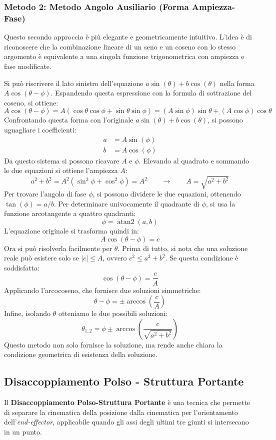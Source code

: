 \documentclass[11pt, a4paper]{report}
\begin{document}
\newpage
\subsubsection*{Metodo 2: Metodo Angolo Ausiliario (Forma Ampiezza-Fase)}

Questo secondo approccio è più elegante e geometricamente intuitivo. L'idea è di riconoscere che la combinazione lineare di un seno e un coseno con lo stesso argomento è equivalente a una singola funzione trigonometrica con ampiezza e fase modificate.

Si può riscrivere il lato sinistro dell'equazione \( a \sin(\theta) + b \cos(\theta) \) nella forma \( A \cos(\theta - \phi) \). Espandendo questa espressione con la formula di sottrazione del coseno, si ottiene:
\[
    A \cos(\theta - \phi) = A (\cos\theta \cos\phi + \sin\theta \sin\phi) = (A\sin\phi)\sin\theta + (A\cos\phi)\cos\theta
\]
Confrontando questa forma con l'originale \( a \sin(\theta) + b \cos(\theta) \), si possono uguagliare i coefficienti:
\begin{align*}
    a &= A \sin(\phi) \\
    b &= A \cos(\phi)
\end{align*}
Da questo sistema si possono ricavare \( A \) e \( \phi \). Elevando al quadrato e sommando le due equazioni si ottiene l'ampiezza \( A \):
\[
    a^2 + b^2 = A^2(\sin^2\phi + \cos^2\phi) = A^2 \qquad \longrightarrow \qquad A = \sqrt{a^2 + b^2}
\]
Per trovare l'angolo di fase \( \phi \), si possono dividere le due equazioni, ottenendo \( \tan(\phi) = a/b \). Per determinare univocamente il quadrante di \( \phi \), si usa la funzione arcotangente a quattro quadranti:
\[
    \phi = \operatorname{atan2}(a, b)
\]
L'equazione originale si trasforma quindi in:
\[
    A \cos(\theta - \phi) = c
\]
Ora si può risolverla facilmente per \( \theta \). Prima di tutto, si nota che una soluzione reale può esistere solo se \( |c| \le A \), ovvero \( c^2 \le a^2 + b^2 \). Se questa condizione è soddisfatta:
\[
    \cos(\theta - \phi) = \frac{c}{A}
\]
Applicando l'arcocoseno, che fornisce due soluzioni simmetriche:
\[
    \theta - \phi = \pm \arccos\left(\frac{c}{A}\right)
\]
Infine, isolando \( \theta \) otteniamo le due possibili soluzioni:
\[
    \theta_{1,2} = \phi \pm \arccos\left(\frac{c}{\sqrt{a^2 + b^2}}\right)
\]
Questo metodo non solo fornisce la soluzione, ma rende anche chiara la condizione geometrica di esistenza della soluzione.

\newpage
\subsection{Disaccoppiamento Polso - Struttura Portante}
Il \textbf{Disaccoppiamento Polso-Struttura Portante} è una tecnica che permette di separare la cinematica della posizione dalla cinematica per l'orientamento dell'\textit{end-effector}, applicabile quando gli assi degli ultimi tre giunti si intersecano in un punto.
\end{document}
